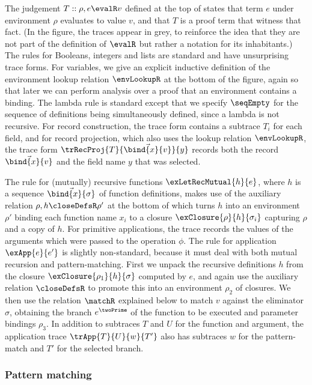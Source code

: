 The judgement $T :: \rho, e \evalR v$ defined at the top of  states that term $e$ under environment $\rho$ evaluates to value $v$, and that $T$ is a proof term that witness that fact. (In the figure, the traces appear in grey, to reinforce the idea that they are not part of the definition of $\evalR$ but rather a notation for its inhabitants.) The rules for Booleans, integers and lists are standard and have unsurprising trace forms. For variables, we give an explicit inductive definition of the environment lookup relation $\envLookupR$ at the bottom of the figure, again so that later we can perform analysis over a proof that an environment contains a binding. The lambda rule is standard except that we specify $\seqEmpty$ for the sequence of definitions being simultaneously defined, since a lambda is not recursive. For record construction, the trace form contains a subtrace $T_i$ for each field, and for record projection, which also uses the lookup relation $\envLookupR$, the trace form $\trRecProj{T}{\vec{\bind{x}{v}}}{y}$ records both the record $\vec{\bind{x}{v}}$ and the field name $y$ that was selected.

The rule for (mutually) recursive functions $\exLetRecMutual{h}{e}$, where $h$ is a sequence $\vec{\bind{x}{\sigma}}$ of function definitions, makes use of the auxiliary relation $\rho, h \closeDefsR \rho'$ at the bottom of  which turns $h$ into an environment $\rho'$ binding each function name $x_i$ to a closure $\exClosure{\rho}{h}{\sigma_i}$ capturing $\rho$ and a copy of $h$. For primitive applications, the trace records the values of the arguments which were passed to the operation $\phi$. The rule for application $\exApp{e}{e'}$ is slightly non-standard, because it must deal with both mutual recursion and pattern-matching. First we unpack the recursive definitions $h$ from the closure $\exClosure{\rho_1}{h}{\sigma}$ computed by $e$, and again use the auxiliary relation $\closeDefsR$ to promote this into an environment $\rho_2$ of closures. We then use the relation $\matchR$ explained below to match $v$ against the eliminator $\sigma$, obtaining the branch $e^\twoPrime$ of the function to be executed and parameter bindings $\rho_3$. In addition to subtraces $T$ and $U$ for the function and argument, the application trace $\trApp{T}{U}{w}{T'}$ also has subtraces $w$ for the pattern-match and $T'$ for the selected branch.

\subsubsection{Pattern matching}
\label{sec:core-language:pattern-match}

